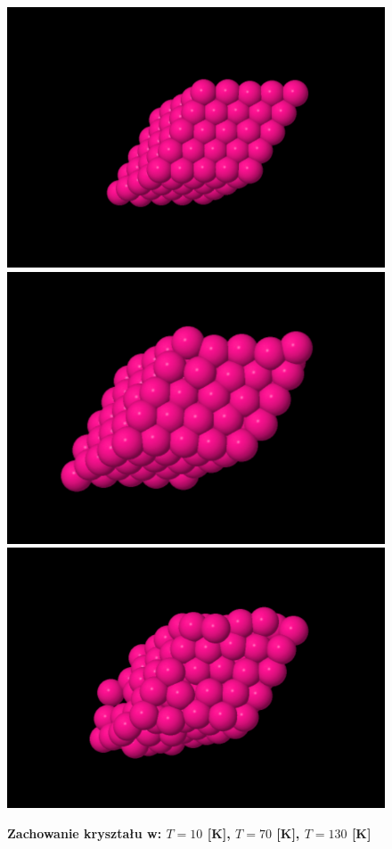 \documentclass[11pt,a4paper]{article}
\begin{document}
\begin{figure}[ht!]
\caption{\textbf{Zachowanie kryształu w: $T=10$ [K], $T=70$ [K], $T=130$ [K]}}
\begin{multicols}{3}
    \includegraphics[width=\linewidth]{../figures/crystal.png}
    \includegraphics[width=\linewidth]{../figures/melting.png}
    \includegraphics[width=\linewidth]{../figures/melted.png}
\end{multicols}
\end{figure}
\end{document}

